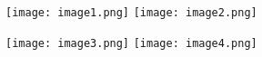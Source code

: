 \documentclass{article}
\begin{document}
\begin{figure}[h]
    \centering
    \begin{minipage}{0.45\textwidth}
        \texttt{[image: image1.png]} %
        \texttt{[image: image2.png]} %
    \end{minipage}
    \hfill
    \begin{minipage}{0.45\textwidth}
        \texttt{[image: image3.png]} %
        \texttt{[image: image4.png]} %
    \end{minipage}
\end{figure}
\end{document}

